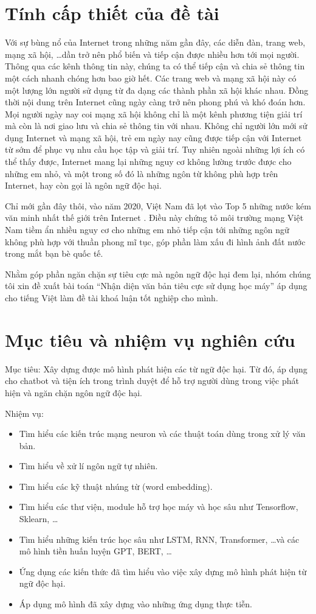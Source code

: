 \section{Tính cấp thiết của đề tài}
Với sự bùng nổ của Internet trong những năm gần đây, các diễn đàn, trang web, mạng xã hội, \dots dần trở nên phổ biến và tiếp cận được nhiều hơn tới mọi người. Thông qua các kênh thông tin này, chúng ta có thể tiếp cận và chia sẻ thông tin một cách nhanh chóng hơn bao giờ hết. Các trang web và mạng xã hội này có một lượng lớn người sử dụng từ đa dạng các thành phần xã hội khác nhau. Đồng thời nội dung trên Internet cũng ngày càng trở nên phong phú và khó đoán hơn. Mọi người ngày nay coi mạng xã hội không chỉ là một kênh phương tiện giải trí mà còn là nơi giao lưu và chia sẻ thông tin với nhau. Không chỉ người lớn mới sử dụng Internet và mạng xã hội, trẻ em ngày nay cũng được tiếp cận với Internet từ sớm để phục vụ nhu cầu học tập và giải trí. Tuy nhiên ngoài những lợi ích có thể thấy được, Internet mang lại những nguy cơ không lường trước được cho những em nhỏ, và một trong số đó là những ngôn từ không phù hợp trên Internet, hay còn gọi là ngôn ngữ độc hại.

Chỉ mới gần đây thôi, vào năm 2020, Việt Nam đã lọt vào Top 5 những nước kém văn minh nhất thế giới trên Internet \cite{webpage28}. Điều này chứng tỏ môi trường mạng Việt Nam tiềm ẩn nhiều nguy cơ cho những em nhỏ tiếp cận tới những ngôn ngữ không phù hợp với thuần phong mĩ tục, góp phần làm xấu đi hình ảnh đất nước trong mắt bạn bè quốc tế.

Nhằm góp phần ngăn chặn sự tiêu cực mà ngôn ngữ độc hại đem lại, nhóm chúng tôi xin đề xuất bài toán ``Nhận diện văn bản tiêu cực sử dụng học máy'' áp dụng cho tiếng Việt làm đề tài khoá luận tốt nghiệp cho mình.

\section{Mục tiêu và nhiệm vụ nghiên cứu}
Mục tiêu: Xây dựng được mô hình phát hiện các từ ngữ độc hại. Từ đó, áp dụng cho chatbot và tiện ích trong trình duyệt để hỗ trợ người dùng trong việc phát hiện và ngăn chặn ngôn ngữ độc hại.

Nhiệm vụ:
\begin{itemize}
    \item Tìm hiểu các kiến trúc mạng neuron và các thuật toán dùng trong xử lý văn bản.
    \item Tìm hiểu về xử lí ngôn ngữ tự nhiên.
    \item Tìm hiểu các kỹ thuật nhúng từ (word embedding).
    \item Tìm hiểu các thư viện, module hỗ trợ học máy và học sâu như Tensorflow, Sklearn, \dots
    \item Tìm hiểu những kiến trúc học sâu như LSTM, RNN, Transformer, \dots và các mô hình tiền huấn luyện GPT, BERT, \dots
    \item Ứng dụng các kiến thức đã tìm hiểu vào việc xây dựng mô hình phát hiện từ ngữ độc hại.
    \item Áp dụng mô hình đã xây dựng vào những ứng dụng thực tiễn.
\end{itemize}

